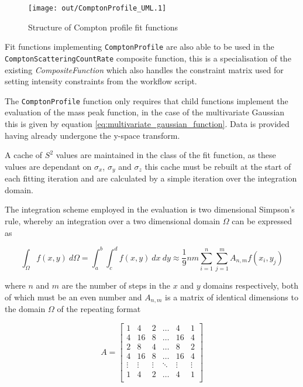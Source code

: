 \documentclass[a4paper]{article}
\begin{document}
\begin{figure}[h!]
  \centering
  \texttt{[image: out/ComptonProfile\_UML.1]}
  \caption{Structure of Compton profile fit functions}
  \label{fig:ComptonProfile_UML}
\end{figure}
\FloatBarrier

Fit functions implementing \texttt{ComptonProfile} are also able to be used in
the \texttt{ComptonScatteringCountRate} composite function, this is a
specialisation of the existing \textit{CompositeFunction} which also handles the
constraint matrix used for setting intensity constraints from the workflow
script.

The \texttt{ComptonProfile} function only requires that child functions
implement the evaluation of the mass peak function, in the case of the
multivariate Gaussian this is given by equation
\ref{eq:multivariate_gaussian_function}. Data is provided having already
undergone the y-space transform.

A cache of $S^{2}$ values are maintained in the class of the fit function, as
these values are dependant on $\sigma_{x}$, $\sigma_{y}$ and $\sigma_{z}$ this
cache must be rebuilt at the start of each fitting iteration and are calculated
by a simple iteration over the integration domain.

The integration scheme employed in the evaluation is two dimensional Simpson's
rule, whereby an integration over a two dimensional domain $\Omega$ can be
expressed as

\begin{equation}
  \int_{\Omega} f(x, y) \: d\Omega =
    \int_{a}^{b} \int_{c}^{d} f(x, y) \: dx \: dy \approx
    \frac{1}{9} n m \sum_{i=1}^{n} \sum_{j=1}^{m} A_{n, m} f(x_{i}, y_{j})
\end{equation}

where $n$ and $m$ are the number of steps in the $x$ and $y$ domains
respectively, both of which must be an even number and $A_{n, m}$ is a matrix of
identical dimensions to the domain $\Omega$ of the repeating format

\[
  A =
  \begin{bmatrix}
    1      & 4      & 2      & \hdots & 4      & 1      \\
    4      & 16     & 8      & \hdots & 16     & 4      \\
    2      & 8      & 4      & \hdots & 8      & 2      \\
    4      & 16     & 8      & \hdots & 16     & 4      \\
    \vdots & \vdots & \vdots & \ddots & \vdots & \vdots \\
    1      & 4      & 2      & \hdots & 4      & 1      \\
  \end{bmatrix}
\]
\end{document}
